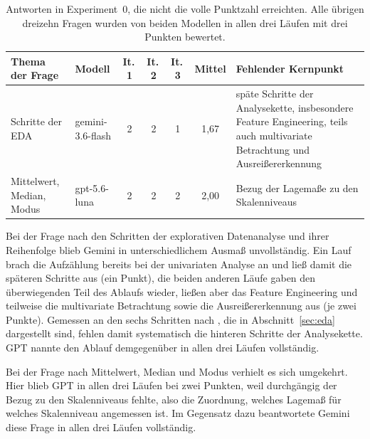 \begin{table}[htbp]
    \centering
    \small
    \caption[Abweichungen von der vollen Punktzahl in Experiment 0]%
    {Antworten in Experiment~0, die nicht die volle Punktzahl erreichten. Alle
    übrigen dreizehn Fragen wurden von beiden Modellen in allen drei Läufen mit
    drei Punkten bewertet.}
    \label{tab:e0-abweichungen}

    \renewcommand{\arraystretch}{1.2}
    \begin{tabularx}{\textwidth}{
        >{\raggedright\arraybackslash}p{2.6cm}
        >{\raggedright\arraybackslash}p{1.5cm}
        c c c c
        >{\raggedright\arraybackslash}X
    }
        \toprule
        \textbf{Thema der Frage} &
        \textbf{Modell} &
        \textbf{It.\,1} &
        \textbf{It.\,2} &
        \textbf{It.\,3} &
        \textbf{Mittel} &
        \textbf{Fehlender Kernpunkt} \\
        \midrule

        Schritte der EDA &
        gemini-3.6-flash & 2 & 2 & 1 & 1,67 &
        späte Schritte der Analysekette, insbesondere Feature Engineering, teils auch multivariate Betrachtung und Ausreißererkennung \\

        Mittelwert, Median, Modus &
        gpt-5.6-luna & 2 & 2 & 2 & 2,00 &
        Bezug der Lagemaße zu den Skalenniveaus \\

        \bottomrule
    \end{tabularx}
\end{table}

Bei der Frage nach den Schritten der explorativen Datenanalyse und ihrer Reihenfolge blieb Gemini in unterschiedlichem Ausmaß unvollständig. Ein Lauf brach die Aufzählung bereits bei der univariaten Analyse an und ließ damit die späteren Schritte aus (ein Punkt), die beiden anderen Läufe gaben den überwiegenden Teil des Ablaufs wieder, ließen aber das Feature Engineering und teilweise die multivariate Betrachtung sowie die Ausreißererkennung aus (je zwei Punkte). Gemessen an den sechs Schritten nach \textcite{rahmany_comparing_2020}, die in Abschnitt~\ref{sec:eda} dargestellt sind, fehlen damit systematisch die hinteren Schritte der Analysekette. GPT nannte den Ablauf demgegenüber in allen drei Läufen vollständig.

Bei der Frage nach Mittelwert, Median und Modus verhielt es sich umgekehrt. Hier blieb GPT in allen drei Läufen bei zwei Punkten, weil durchgängig der Bezug zu den Skalenniveaus fehlte, also die Zuordnung, welches Lagemaß für welches Skalenniveau angemessen ist. Im Gegensatz dazu beantwortete Gemini diese Frage in allen drei Läufen vollständig.

